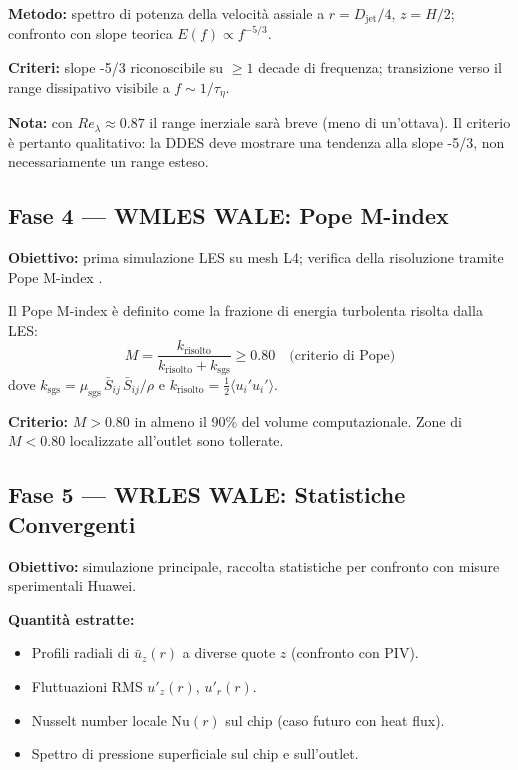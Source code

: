 \documentclass[11pt,a4paper]{article}
\newcommand{\Djet}{D_{\mathrm{jet}}}
\begin{document}
\textbf{Metodo:} spettro di potenza della velocità assiale a $r = \Djet/4$, $z = H/2$; confronto con slope teorica $E(f) \propto f^{-5/3}$.

\textbf{Criteri:} slope -5/3 riconoscibile su $\geq 1$ decade di frequenza; transizione verso il range dissipativo visibile a $f \sim 1/\tau_\eta$.

\textbf{Nota:} con $Re_\lambda \approx 0.87$ il range inerziale sarà breve (meno di un'ottava). Il criterio è pertanto qualitativo: la DDES deve mostrare una tendenza alla slope -5/3, non necessariamente un range esteso.

\subsection{Fase 4 — WMLES WALE: Pope M-index}

\textbf{Obiettivo:} prima simulazione LES su mesh L4; verifica della risoluzione tramite Pope M-index \cite{Pope2000}.

Il Pope M-index è definito come la frazione di energia turbolenta risolta dalla LES:
\begin{equation}
  M = \frac{k_{\mathrm{risolto}}}{k_{\mathrm{risolto}} + k_{\mathrm{sgs}}}
  \geq 0.80 \quad \text{(criterio di Pope)}
\end{equation}
dove $k_{\mathrm{sgs}} = \mu_{\mathrm{sgs}}\,\bar{S}_{ij}\,\bar{S}_{ij}/\rho$ e $k_{\mathrm{risolto}} = \frac{1}{2}\langle u_i'u_i'\rangle$.

\textbf{Criterio:} $M > 0.80$ in almeno il 90\% del volume computazionale. Zone di $M < 0.80$ localizzate all'outlet sono tollerate.

\subsection{Fase 5 — WRLES WALE: Statistiche Convergenti}

\textbf{Obiettivo:} simulazione principale, raccolta statistiche per confronto con misure sperimentali Huawei.

\textbf{Quantità estratte:}
\begin{itemize}
  \item Profili radiali di $\bar{u}_z(r)$ a diverse quote $z$ (confronto con PIV).
  \item Fluttuazioni RMS $u'_z(r)$, $u'_r(r)$.
  \item Nusselt number locale $\mathrm{Nu}(r)$ sul chip (caso futuro con heat flux).
  \item Spettro di pressione superficiale sul chip e sull'outlet.
\end{itemize}
\end{document}
